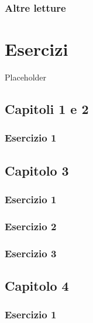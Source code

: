 \documentclass[a4paper,12pt,oneside]{book}
\begin{document}
\hypertarget{altre-letture-10}{%
\subsection{Altre letture}\label{altre-letture-10}}

\hypertarget{esercizi}{%
\chapter{Esercizi}\label{esercizi}}

Placeholder

\hypertarget{capitoli-1-e-2}{%
\section{Capitoli 1 e 2}\label{capitoli-1-e-2}}

\hypertarget{esercizio-1}{%
\subsection{Esercizio 1}\label{esercizio-1}}

\hypertarget{capitolo-3}{%
\section{Capitolo 3}\label{capitolo-3}}

\hypertarget{esercizio-1-1}{%
\subsection{Esercizio 1}\label{esercizio-1-1}}

\hypertarget{esercizio-2}{%
\subsection{Esercizio 2}\label{esercizio-2}}

\hypertarget{esercizio-3}{%
\subsection{Esercizio 3}\label{esercizio-3}}

\hypertarget{capitolo-4}{%
\section{Capitolo 4}\label{capitolo-4}}

\hypertarget{esercizio-1-2}{%
\subsection{Esercizio 1}\label{esercizio-1-2}}
\end{document}
